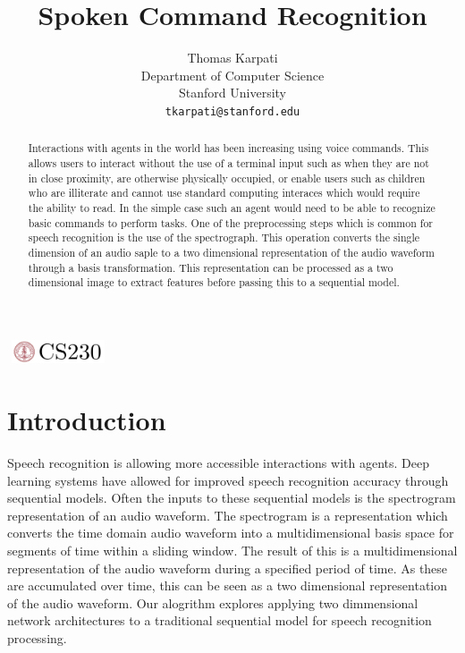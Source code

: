 \documentclass{article}
\title{Spoken Command Recognition}
\author{
  Thomas Karpati \\
  Department of Computer Science\\
  Stanford University\\
  \texttt{tkarpati@stanford.edu} \\
}
\begin{document}

\begin{center}
\includegraphics[width=3cm, height=0.7cm]{CS230}
\end{center}

\maketitle

\begin{abstract}
  Interactions with agents in the world has been increasing using voice
  commands. This allows users to interact without the use of a
  terminal input such as when they are not in close proximity, are
  otherwise physically occupied, or enable users such as children who
  are illiterate and cannot use standard computing interaces which
  would require the ability to read. In the simple case such an agent
  would need to be able to recognize basic commands to perform
  tasks. One of the preprocessing steps which is common for speech
  recognition is the use of the spectrograph. This operation converts
  the single dimension of an audio saple to a two dimensional
  representation of the audio waveform through a basis
  transformation. This representation can be processed as a two
  dimensional image to extract features before passing this to a
  sequential model. 
\end{abstract}

\section{Introduction}
Speech recognition is allowing more accessible interactions with
agents. Deep learning systems have allowed for improved speech
recognition accuracy through sequential models. Often the inputs to
these sequential models is the spectrogram representation of an audio
waveform. The spectrogram is a representation which converts the time
domain audio waveform into a multidimensional basis space for segments
of time within a sliding window. The result of this is a
multidimensional representation of the audio waveform during a
specified period of time. As these are accumulated over time, this can
be seen as a two dimensional representation of the audio waveform. Our
alogrithm explores applying two dimmensional network architectures to
a traditional sequential model for speech recognition processing. 
\end{document}
